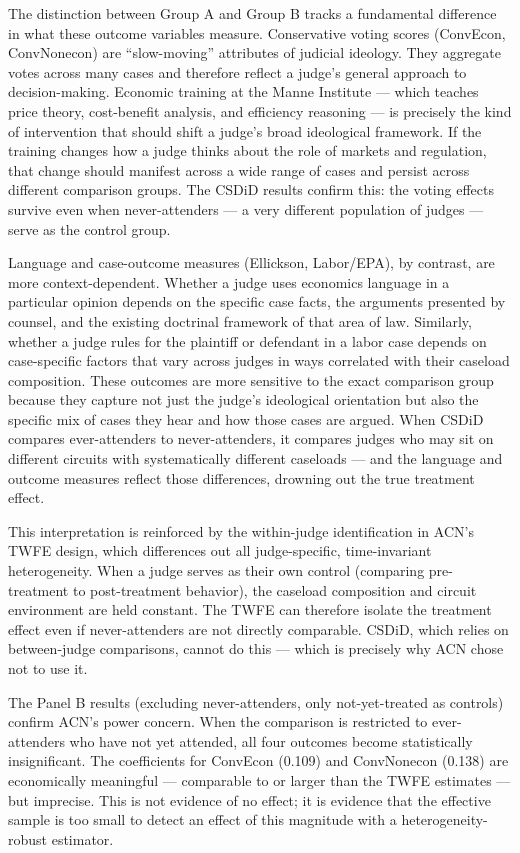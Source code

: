 \documentclass[12pt,a4paper]{article}
\begin{document}
The distinction between Group A and Group B tracks a fundamental difference in what these outcome variables measure. Conservative voting scores (ConvEcon, ConvNonecon) are ``slow-moving'' attributes of judicial ideology. They aggregate votes across many cases and therefore reflect a judge's general approach to decision-making. Economic training at the Manne Institute --- which teaches price theory, cost-benefit analysis, and efficiency reasoning --- is precisely the kind of intervention that should shift a judge's broad ideological framework. If the training changes how a judge thinks about the role of markets and regulation, that change should manifest across a wide range of cases and persist across different comparison groups. The CSDiD results confirm this: the voting effects survive even when never-attenders --- a very different population of judges --- serve as the control group.

Language and case-outcome measures (Ellickson, Labor/EPA), by contrast, are more context-dependent. Whether a judge uses economics language in a particular opinion depends on the specific case facts, the arguments presented by counsel, and the existing doctrinal framework of that area of law. Similarly, whether a judge rules for the plaintiff or defendant in a labor case depends on case-specific factors that vary across judges in ways correlated with their caseload composition. These outcomes are more sensitive to the exact comparison group because they capture not just the judge's ideological orientation but also the specific mix of cases they hear and how those cases are argued. When CSDiD compares ever-attenders to never-attenders, it compares judges who may sit on different circuits with systematically different caseloads --- and the language and outcome measures reflect those differences, drowning out the true treatment effect.

This interpretation is reinforced by the within-judge identification in ACN's TWFE design, which differences out all judge-specific, time-invariant heterogeneity. When a judge serves as their own control (comparing pre-treatment to post-treatment behavior), the caseload composition and circuit environment are held constant. The TWFE can therefore isolate the treatment effect even if never-attenders are not directly comparable. CSDiD, which relies on between-judge comparisons, cannot do this --- which is precisely why ACN chose not to use it.

The Panel B results (excluding never-attenders, only not-yet-treated as controls) confirm ACN's power concern. When the comparison is restricted to ever-attenders who have not yet attended, all four outcomes become statistically insignificant. The coefficients for ConvEcon (0.109) and ConvNonecon (0.138) are economically meaningful --- comparable to or larger than the TWFE estimates --- but imprecise. This is not evidence of no effect; it is evidence that the effective sample is too small to detect an effect of this magnitude with a heterogeneity-robust estimator.
\end{document}
